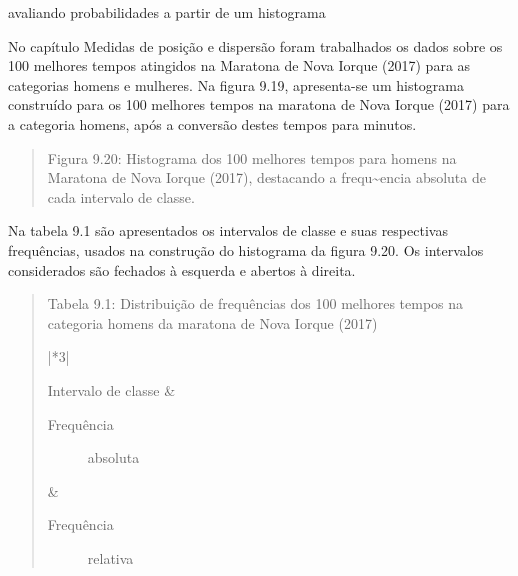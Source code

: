 \begin{task}{avaliando probabilidades a partir de um histograma}
\label{ativ-probabilidade-histograma}

No capítulo Medidas de posição e dispersão foram trabalhados os dados sobre os 100 melhores tempos atingidos na Maratona de Nova Iorque (2017) para as categorias homens e mulheres. Na figura 9.19, apresenta-se um histograma construído para os 100 melhores tempos na maratona de Nova Iorque (2017) para a categoria homens, após a conversão destes tempos para minutos.
\begin{quote}

\begin{figure}[H]
\centering

\noindent{}
\end{figure}

Figura 9.20: Histograma dos 100 melhores tempos para homens na Maratona de Nova Iorque (2017), destacando a frequ\textasciitilde{}encia absoluta de cada intervalo de classe.
\end{quote}

Na tabela 9.1 são apresentados os intervalos de classe e suas respectivas frequências, usados na construção do histograma da figura 9.20. Os intervalos considerados são fechados à esquerda e abertos à direita.
\begin{quote}

Tabela 9.1: Distribuição de frequências dos 100 melhores tempos na categoria homens da maratona de Nova Iorque (2017)


\begin{savenotes}\sphinxattablestart
\centering
\begin{tabular}[t]{|*{3}{|}}
\hline

Intervalo de classe
&\begin{description}
\item[{Frequência}] \leavevmode
absoluta

\end{description}
&\begin{description}
\item[{Frequência}] \leavevmode
relativa


\end{description}
\end{tabular}
\end{savenotes}
\end{quote}
\end{task}
